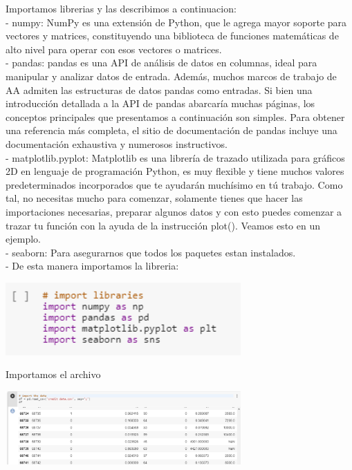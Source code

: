 \documentclass[12pt,letterpaper]{article}
\begin{document}
Importamos librerias y las describimos a continuacion:\\
- numpy: NumPy es una extensi\'on de Python, que le agrega mayor soporte para vectores y matrices, constituyendo una biblioteca de funciones matem\'aticas de alto nivel para operar con esos vectores o matrices.\\
- pandas: pandas es una API de an\'alisis de datos en columnas, ideal para manipular y analizar datos de entrada. Adem\'as, muchos marcos de trabajo de AA admiten las estructuras de datos pandas como entradas. Si bien una introducci\'on detallada a la API de pandas abarcar\'ia muchas p\'aginas, los conceptos principales que presentamos a continuaci\'on son simples. Para obtener una referencia m\'as completa, el sitio de documentaci\'on de pandas incluye una documentaci\'on exhaustiva y numerosos instructivos.\\
- matplotlib.pyplot: Matplotlib es una librer\'ia de trazado utilizada para gr\'aficos 2D en lenguaje de programaci\'on Python, es muy flexible y tiene muchos valores predeterminados incorporados que te ayudar\'an much\'isimo en t\'u trabajo. Como tal, no necesitas mucho para comenzar, solamente tienes que hacer las importaciones necesarias, preparar algunos datos y con esto puedes comenzar a trazar tu funci\'on con la ayuda de la instrucci\'on plot(). Veamos esto en un ejemplo.\\
- seaborn: Para asegurarnos que todos los paquetes estan instalados.\\
- De esta manera importamos la libreria: \\

\begin{center}
\includegraphics[width=9cm]{IMG/2.png} 
\end{center}

Importamos el archivo


\begin{center}
\includegraphics[width=9cm]{IMG/3.png} 
\end{center}
\end{document}
